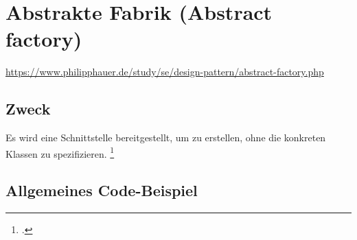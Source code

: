 \documentclass{lehramt-informatik-haupt}
\begin{document}

\chapter{Abstrakte Fabrik (Abstract factory)}

\begin{liQuellen}
\item \cite{wiki:abstrakte-fabrik}
\item \url{https://www.philipphauer.de/study/se/design-pattern/abstract-factory.php}
\item \cite[PDF Seite 77-84]{gof}
\item \cite[Kapitel 8.3.2, Seite 250-252]{schatten}
\item \cite[Kapitel 1.3, Seite 25-29]{eilebrecht}
\item \cite[Kapitel 11, Seite 127-145]{siebler}
\end{liQuellen}

\section{Zweck}

Es wird eine Schnittstelle bereitgestellt, um  zu erstellen, ohne die konkreten
Klassen zu spezifizieren.
\footcite[Seite 25]{eilebrecht}

\liEntwurfsAbstrakteFabrikUml

%

\section{Allgemeines Code-Beispiel}

\liEntwurfsAbstrakteFabrikCode

\literatur
\end{document}
